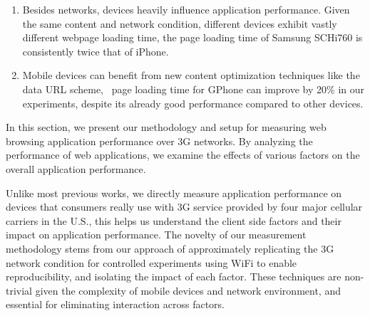 \begin{enumerate}




\item Besides networks, devices heavily influence application 
performance. Given the same content and network condition, different 
devices exhibit vastly different webpage loading time, \eg the
page loading time of Samsung SCHi760 is consistently twice that of 
iPhone. 

\item Mobile devices can benefit from new content optimization
techniques like the data URL scheme, \eg~page loading time for 
GPhone can improve by 20\% in our experiments, despite 
its already good performance compared to other devices.
\end{enumerate}

\label{sec:app.method}

In this section, we present our methodology and setup for measuring web browsing application performance over 3G networks. By analyzing the performance of web applications, we examine the effects of various factors on the overall application performance.

Unlike most previous works, we directly measure application 
performance on devices that consumers really use with 3G service 
provided by four major cellular carriers in the U.S., this helps us 
understand the client side factors and their impact on application 
performance. The novelty of our measurement methodology stems from 
our approach of approximately replicating the 3G network condition 
for controlled experiments using WiFi to enable reproducibility, 
and isolating the impact of each factor. These techniques are 
non-trivial given the complexity of mobile devices and network 
environment, and essential for eliminating interaction across factors. 

